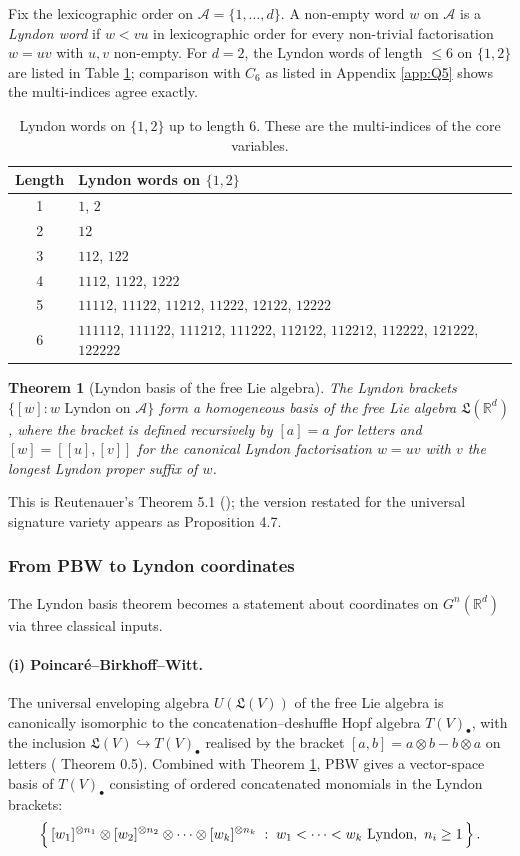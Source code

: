 \documentclass[12pt,english]{article}
\providecommand{\tabularnewline}{\\}
\newtheorem{theorem}{Theorem}
\theoremstyle{remark}
\begin{document}
Fix the lexicographic order on $\mathcal{A}=\{1,\ldots,d\}$. A non-empty
word $w$ on $\mathcal{A}$ is a \emph{Lyndon word} if $w<vu$ in
lexicographic order for every non-trivial factorisation $w=uv$ with
$u,v$ non-empty. For $d=2$, the Lyndon words of length $\leq6$
on $\{1,2\}$ are listed in Table \ref{tab:Lyndon-d2}; comparison
with $C_{6}$ as listed in Appendix \ref{app:Q5} shows the multi-indices
agree exactly.

\begin{table}[H]
\centering
\begin{tabular}{|c|l|}
\hline
Length & Lyndon words on $\{1,2\}$\tabularnewline
\hline\hline
1 & $1$, $2$\tabularnewline\hline
2 & $12$\tabularnewline\hline
3 & $112$, $122$\tabularnewline\hline
4 & $1112$, $1122$, $1222$\tabularnewline\hline
5 & $11112$, $11122$, $11212$, $11222$, $12122$, $12222$\tabularnewline\hline
6 & $111112$, $111122$, $111212$, $111222$, $112122$, $112212$, $112222$, $121222$, $122222$\tabularnewline\hline
\end{tabular}
\caption{Lyndon words on $\{1,2\}$ up to length 6. These are the multi-indices
of the core variables.\label{tab:Lyndon-d2}}
\end{table}

\begin{theorem}[Lyndon basis of the free Lie algebra]
\label{thm:Lyndon-basis} The Lyndon brackets $\{[w]:w\text{ Lyndon on }\mathcal{A}\}$
form a homogeneous basis of the free Lie algebra $\mathfrak{L}(\mathbb{R}^{d})$,
where the bracket is defined recursively by $[a]=a$ for letters and
$[w]=[[u],[v]]$ for the canonical Lyndon factorisation $w=uv$ with
$v$ the longest Lyndon proper suffix of $w$.
\end{theorem}

This is Reutenauer's Theorem 5.1 (\cite{Reutenauer}); the version
restated for the universal signature variety appears as \cite{varieties}
Proposition 4.7.

\subsubsection{From PBW to Lyndon coordinates\label{subsubsec:PBW-Radford}}

The Lyndon basis theorem becomes a statement about coordinates on
$G^{n}(\mathbb{R}^{d})$ via three classical inputs.

\paragraph{(i) Poincaré--Birkhoff--Witt.}
The universal enveloping algebra $U(\mathfrak{L}(V))$ of the free
Lie algebra is canonically isomorphic to the concatenation--deshuffle
Hopf algebra $T(V)_{\bullet}$, with the inclusion $\mathfrak{L}(V)\hookrightarrow T(V)_{\bullet}$
realised by the bracket $[a,b]=a\otimes b-b\otimes a$ on letters
(\cite{Reutenauer} Theorem 0.5). Combined with Theorem \ref{thm:Lyndon-basis},
PBW gives a vector-space basis of $T(V)_{\bullet}$ consisting of
ordered concatenated monomials in the Lyndon brackets:
\[
\Bigl\{\,[w_{1}]^{\otimes n_{1}}\otimes[w_{2}]^{\otimes n_{2}}\otimes\cdots\otimes[w_{k}]^{\otimes n_{k}}\;:\;w_{1}<\cdots<w_{k}\text{ Lyndon},\ n_{i}\geq1\,\Bigr\}\,.
\]
\end{document}
